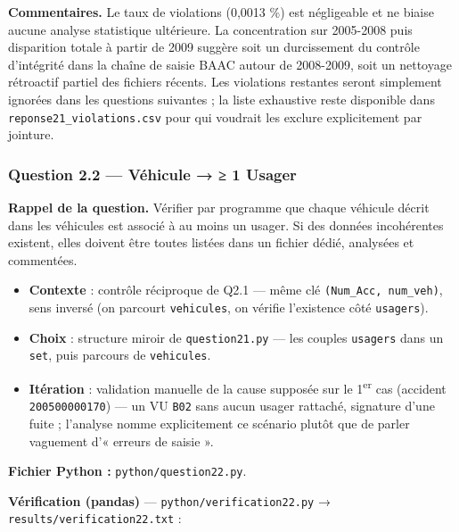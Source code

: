\documentclass[11pt,a4paper]{article}
\newcommand{\rub}[2]{\textbf{\textcolor{#1}{#2}}}
\begin{document}
\rub{labcomment}{Commentaires.} Le taux de violations (0,0013 \%) est négligeable et ne biaise aucune analyse statistique ultérieure. La concentration sur 2005-2008 puis disparition totale à partir de 2009 suggère soit un durcissement du contrôle d'intégrité dans la chaîne de saisie BAAC autour de 2008-2009, soit un nettoyage rétroactif partiel des fichiers récents. Les violations restantes seront simplement ignorées dans les questions suivantes ; la liste exhaustive reste disponible dans \texttt{reponse21\_violations.csv} pour qui voudrait les exclure explicitement par jointure.

\clearpage
\subsubsection*{Question 2.2 — Véhicule → ≥ 1 Usager}

\rub{labrappel}{Rappel de la question.} Vérifier par programme que chaque véhicule décrit dans les véhicules est associé à au moins un usager. Si des données incohérentes existent, elles doivent être toutes listées dans un fichier dédié, analysées et commentées.

\begin{agentbox}
\begin{itemize}
\item \textbf{Contexte} : contrôle réciproque de Q2.1 — même clé \texttt{(Num\_Acc, num\_veh)}, sens inversé (on parcourt \texttt{vehicules}, on vérifie l'existence côté \texttt{usagers}).
\item \textbf{Choix} : structure miroir de \texttt{question21.py} — les couples \texttt{usagers} dans un \texttt{set}, puis parcours de \texttt{vehicules}.
\item \textbf{Itération} : validation manuelle de la cause supposée sur le 1\textsuperscript{er} cas (accident \texttt{200500000170}) — un VU \texttt{B02} sans aucun usager rattaché, signature d'une fuite ; l'analyse nomme explicitement ce scénario plutôt que de parler vaguement d'« erreurs de saisie ».
\end{itemize}
\end{agentbox}

\rub{labfichier}{Fichier Python :} \texttt{python/question22.py}.

\rub{labverif}{Vérification (pandas)} --- \texttt{python/verification22.py} → \texttt{results/verification22.txt} :
\end{document}

